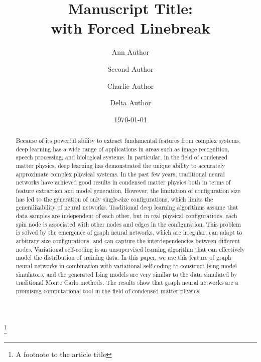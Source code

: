\documentclass[%
reprint,
amsmath,amssymb,
aps,
]{revtex4-2}
\begin{document}
	
	
	\title{Manuscript Title:\\with Forced Linebreak}%
	\thanks{A footnote to the article title}%
	
	\author{Ann Author}
	\author{Second Author}%
	
	
	\author{Charlie Author}
	\author{Delta Author}
	
	
	\date{\today}%
	
	\begin{abstract}
		Because of its powerful ability to extract fundamental features from complex systems, deep learning has a wide range of applications in areas such as image recognition, speech processing, and biological systems. In particular, in the field of condensed matter physics, deep learning has demonstrated the unique ability to accurately approximate complex physical systems. In the past few years, traditional neural networks have achieved good results in condensed matter physics both in terms of feature extraction and model generation. However, the limitation of configuration size has led to the generation of only single-size configurations, which limits the generalizability of neural networks. Traditional deep learning algorithms assume that data samples are independent of each other, but in real physical configurations, each spin node is associated with other nodes and edges in the configuration. This problem is solved by the emergence of graph neural networks, which are irregular, can adapt to arbitrary size configurations, and can capture the interdependencies between different nodes. Variational self-coding is an unsupervised learning algorithm that can effectively model the distribution of training data. In this paper, we use this feature of graph neural networks in combination with variational self-coding to construct Ising model simulators, and the generated Ising models are very similar to the data simulated by traditional Monte Carlo methods. The results show that graph neural networks are a promising computational tool in the field of condensed matter physics.
	\end{abstract}
	
\end{document}
